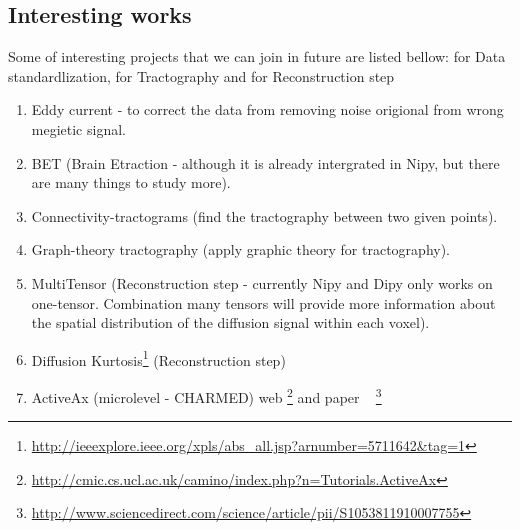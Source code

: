 \subsection{Interesting works}
Some of interesting projects that we can join in future are listed bellow: for Data standardlization, for Tractography and for Reconstruction step
\begin{enumerate}
\item Eddy current - to correct the data from removing noise origional from wrong megietic signal.
\item BET (Brain Etraction - although it is already intergrated in Nipy, but there are many things to study more).
\item Connectivity-tractograms (find the tractography between two given points).
\item Graph-theory tractography (apply graphic theory for tractography).
\item MultiTensor (Reconstruction step - currently Nipy and Dipy only works on one-tensor. Combination many tensors will provide more information about the spatial distribution of the diffusion signal within each voxel).
\item Diffusion Kurtosis\footnote{\url{http://ieeexplore.ieee.org/xpls/abs_all.jsp?arnumber=5711642&tag=1}} (Reconstruction step)
\item ActiveAx (microlevel - CHARMED) web \footnote{\url{http://cmic.cs.ucl.ac.uk/camino/index.php?n=Tutorials.ActiveAx}} and paper ~\cite{alexander2010paper} \footnote{\url{http://www.sciencedirect.com/science/article/pii/S1053811910007755}}
\end{enumerate}
